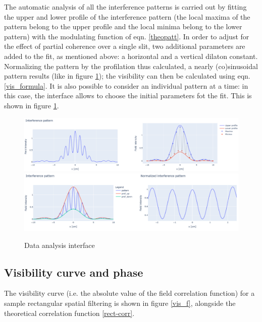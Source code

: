 The automatic analysis of all the interference patterns is carried out by fitting the upper and lower profile of the interference pattern (the local maxima of the pattern belong to the upper profile and the local minima belong 
to the lower pattern) with the modulating function of eqn. \eqref{theopatt}. In order to adjust for the effect of partial coherence over a single slit, two additional 
parameters are added to the fit, as mentioned above: a horizontal and a vertical dilaton constant. Normalizing the pattern by the profilation thus calculated, 
a nearly (co)sinusoidal pattern results (like in figure \ref{data_an}); the visibility can then be calculated using eqn. \eqref{vis_formula}. 
It is also possible to consider an individual pattern at a time: in this case, the interface allows to choose the initial parameters fot the fit. 
This is shown in figure \ref{data_an}.

\begin{figure}[!ht]
    \centering
    \includegraphics[width = \textwidth]{Img/an_11.png}
    \includegraphics[width = \textwidth]{Img/an_22.png}
    \caption{Data analysis interface}
    \label{data_an}
\end{figure}
\subsection{Visibility curve and phase}

The visibility curve (i.e. the absolute value of the field correlation function) for a sample rectangular spatial filtering is 
shown in figure \ref{vis_f}, alongside the theoretical correlation function \eqref{rect-corr}.

